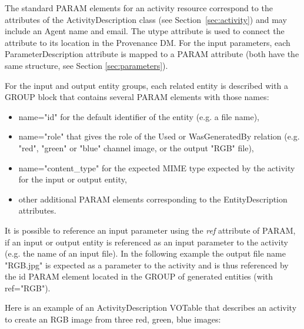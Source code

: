 The standard PARAM elements for an activity resource correspond to the attributes of the ActivityDescription class (see Section~\ref{sec:activity}) and may include an Agent name and email. The utype attribute is used to connect the attribute to its location in the Provenance DM.
For the input parameters, each ParameterDescription attribute is mapped to a PARAM attribute (both have the same structure, see Section \ref{sec:parameters}).

For the input and output entity groups, each related entity is described with a GROUP block that contains several PARAM elements with those names:
\begin{itemize}
 \item name="id" for the default identifier of the entity (e.g. a file name),
 \item name="role" that gives the role of the Used or WasGeneratedBy relation (e.g. "red", "green" or "blue" channel image, or the output "RGB" file),
 \item name="content\_type" for the expected MIME type expected by the activity for the input or output entity,
 \item other additional PARAM elements corresponding to the EntityDescription attributes.
 \end{itemize} 

It is possible to reference an input parameter using the \emph{ref} attribute of PARAM, if an input or output entity is referenced as an input parameter to the activity (e.g. the name of an input file). In the following example the output file name "RGB.jpg" is expected as a parameter to the activity and is thus referenced by the id PARAM element located in the GROUP of generated entities (with ref="RGB").

Here is an example of an ActivityDescription VOTable that describes an activity to create an RGB image from three red, green, blue images:


